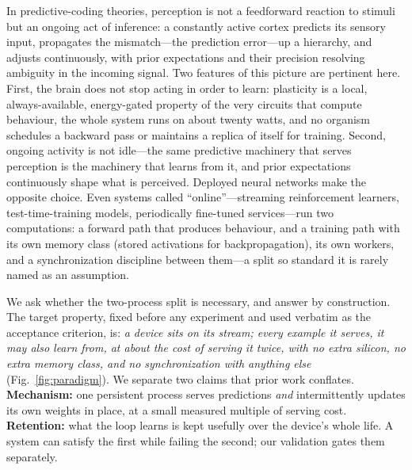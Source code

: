 \documentclass[sn-nature]{sn-jnl}   %
\begin{document}
In predictive-coding theories, perception is not a feedforward reaction to
stimuli but an ongoing act of inference: a constantly active cortex predicts
its sensory input, propagates the mismatch---the prediction error---up a
hierarchy, and adjusts continuously, with prior expectations and their precision
resolving ambiguity in the incoming signal\cite{rao1999predictive,friston2010free,
keller2018predictive,bastos2012canonical}. Two features of this picture are
pertinent here. First, the brain does not stop acting in order to learn:
plasticity is a local, always-available, energy-gated property of the very
circuits that compute behaviour\cite{fremaux2016neuromodulated,
lillicrap2020backpropagation}, the whole system runs on about twenty
watts\cite{attwell2001energy}, and no organism schedules a backward pass or
maintains a replica of itself for training. Second, ongoing activity is not
idle---the same predictive machinery that serves perception is the machinery
that learns from it, and prior expectations continuously shape what is
perceived\cite{flounders2019neural}. Deployed neural networks make the opposite
choice. Even systems called ``online''---streaming reinforcement learners,
test-time-training models, periodically fine-tuned services---run two
computations: a forward path that produces behaviour, and a training path with
its own memory class (stored activations for backpropagation), its own workers,
and a synchronization discipline between them\cite{espeholt2018impala,
horgan2018distributed,sun2020test,elsayed2024streaming}---a split so standard it
is rarely named as an assumption.

We ask whether the two-process split is necessary, and answer by construction.
The target property, fixed before any experiment and used verbatim as the
acceptance criterion, is: \emph{a device sits on its stream; every example it
serves, it may also learn from, at about the cost of serving it twice, with no
extra silicon, no extra memory class, and no synchronization with anything
else} (Fig.~\ref{fig:paradigm}). We separate two claims that prior work conflates. \textbf{Mechanism:}
one persistent process serves predictions \emph{and} intermittently updates its
own weights in place, at a small measured multiple of serving cost.
\textbf{Retention:} what the loop learns is kept usefully over the device's
whole life. A system can satisfy the first while failing the second; our
validation gates them separately.
\end{document}
